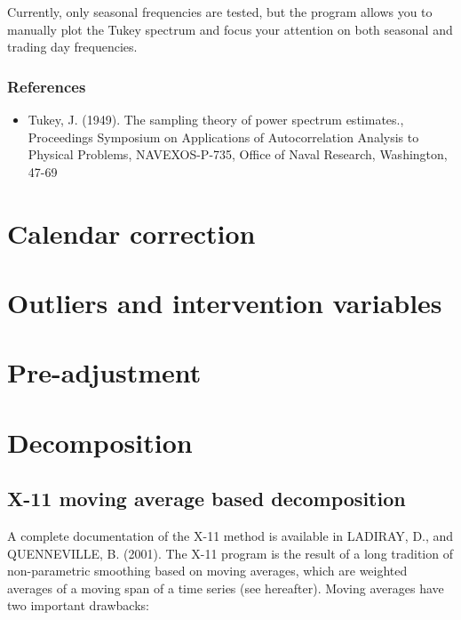 \documentclass[
]{book}
\providecommand{\tightlist}{%
  \setlength{\itemsep}{0pt}\setlength{\parskip}{0pt}}
\begin{document}
Currently, only seasonal frequencies are tested, but the program allows you to manually plot the Tukey spectrum and focus your attention on both seasonal
and trading day frequencies.

\hypertarget{references-5}{%
\subsubsection{References}\label{references-5}}

\begin{itemize}
\tightlist
\item
  Tukey, J. (1949). The sampling theory of power spectrum estimates., Proceedings Symposium on Applications of Autocorrelation Analysis to Physical Problems, NAVEXOS-P-735, Office of Naval Research, Washington, 47-69
\end{itemize}

\hypertarget{calendar-correction}{%
\section{Calendar correction}\label{calendar-correction}}

\hypertarget{outliers-and-intervention-variables}{%
\section{Outliers and intervention variables}\label{outliers-and-intervention-variables}}

\hypertarget{pre-adjustment}{%
\section{Pre-adjustment}\label{pre-adjustment}}

\hypertarget{decomposition}{%
\section{Decomposition}\label{decomposition}}

\hypertarget{x-11-moving-average-based-decomposition}{%
\subsection{X-11 moving average based decomposition}\label{x-11-moving-average-based-decomposition}}

A complete documentation of the X-11 method is available in LADIRAY, D.,
and QUENNEVILLE, B. (2001). The X-11 program is the result of a long
tradition of non-parametric smoothing based on moving averages, which
are weighted averages of a moving span of a time series (see hereafter).
Moving averages have two important drawbacks:
\end{document}
